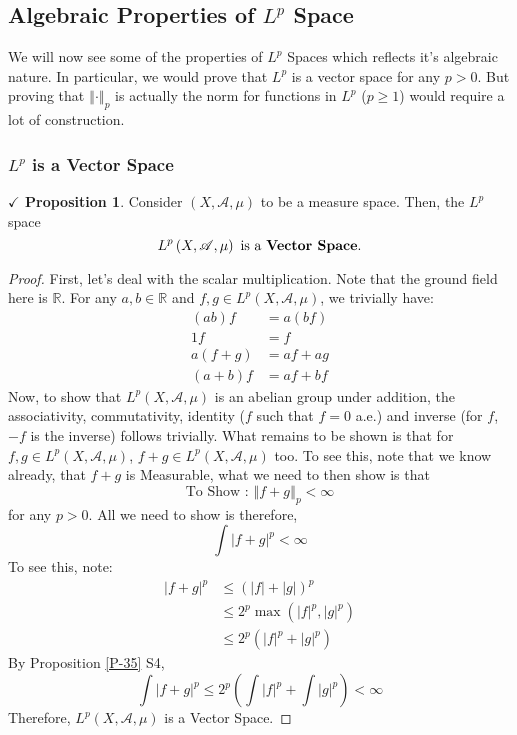 \documentclass{article}
\theoremstyle{definition}
\theoremstyle{remark}
\theoremstyle{definition}
\theoremstyle{definition}
\newtheorem{proposition}{$\checkmark$ Proposition}
\theoremstyle{definition}
\newcommand{\abs}[1]{\left \vert #1\right \vert}
\newcommand{\norm}[1]{\left \Vert #1 \right \Vert}
\newcommand{\R}{\mathbb{R}}
\newcommand{\alg}[1]{\mathscr{#1}}
\newcommand{\Lp}[1]{L^{p}\left (#1\right )}
\begin{document}
\subsection{Algebraic Properties of $ L^{p} $ Space}
We will now see some of the properties of $ L^{p} $ Spaces which reflects it's algebraic nature. In particular, we would prove that $ L^{p} $ is a vector space for any $ p> 0 $. But proving that $ \norm{\cdot }_{p} $ is actually the norm for functions in $ L^{p} $ ($ p\ge 1 $) would require a lot of construction.
\subsubsection{$ L^{p} $ is a Vector Space}
\begin{proposition}\label{P-38}
	Consider $ (X,\alg{A},\mu) $ to be a measure space. Then, the $ L^{p} $ space
	\[\Lp{X,\alg{A},\mu} \text{ is a \textbf{Vector Space}}.\]
\end{proposition}
\begin{proof}
	First, let's deal with the scalar multiplication. Note that the ground field here is $ \R $. For any $ a,b\in \R $ and $ f,g \in \Lp{X,\alg{A},\mu} $, we trivially have:
	\begin{align*}
		(ab)f &= a(bf)\\
		1f &= f\\
		a(f + g) &= af + ag\\
		(a+b)f &= af+ bf
	\end{align*}
Now, to show that $ L^{p}(X,\alg{A},\mu) $ is an abelian group under addition, the associativity, commutativity, identity ($ f $ such that $ f = 0 $ a.e.) and inverse (for $ f $, $ -f $ is the inverse) follows trivially. What remains to be shown is that for $f,g \in \Lp{X,\alg{A},\mu}  $, $ f + g \in \Lp{X,\alg{A},\mu} $ too. To see this, note that we know already, that $ f +g $ is Measurable, what we need to then show is that 
\[\text{To Show : }\norm{f+ g}_p < \infty\]
for any $ p > 0 $. All we need to show is therefore,
\[\int \abs{f + g}^{p} < \infty\]
To see this, note:
\begin{align*}
	\abs{f + g}^{p} &\le \left (\abs{f} + \abs{g}\right )^{p}\\&\le 2^{p}\max\left (\abs{f}^{p},\abs{g}^{p}\right )\\
	&\le 2^{p}\left (\abs{f}^{p} + \abs{g}^{p}\right )
\end{align*}
By Proposition \ref{P-35} S4,
\[\int \abs{f+ g}^{p} \le 2^{p}\left ( \int \abs{f}^{p} + \int \abs{g}^{p}\right) < \infty\]
Therefore, $ \Lp{X,\alg{A},\mu} $ is a Vector Space.
\end{proof}
\hrulefill
\end{document}

